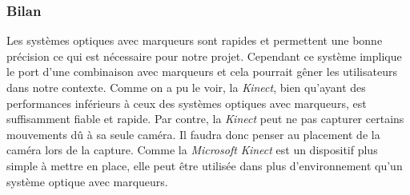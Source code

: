 \subsubsection{Bilan}
Les systèmes optiques avec marqueurs sont rapides et permettent une bonne précision ce qui est nécessaire pour notre projet. Cependant ce système implique le port d'une combinaison avec marqueurs et cela pourrait gêner les utilisateurs dans notre contexte. Comme on a pu le voir, la \emph{Kinect}, bien qu'ayant des performances inférieurs à ceux des systèmes optiques avec marqueurs, est suffisamment fiable et rapide. Par contre, la \emph{Kinect} peut ne pas capturer certains mouvements dû à sa seule caméra. Il faudra donc penser au placement de la caméra lors de la capture. Comme la \emph{Microsoft Kinect} est un dispositif plus simple à mettre en place, elle peut être utilisée dans plus d'environnement qu'un système optique avec marqueurs.

